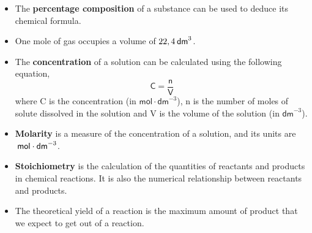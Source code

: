 \begin{itemize}[noitemsep]
\label{m38712*uid116}\item The \textbf{percentage composition} of a substance can be used to deduce its chemical formula.
\label{m38712*uid117}\item One mole of gas occupies a volume of $22,4\phantom{\rule{2pt}{0ex}}{\mathsf{dm}}^{3}$.
\label{m38712*uid118}\item The \textbf{concentration} of a solution can be calculated using the following equation,
\label{m38712*id286019}\nopagebreak\noindent{}
    \begin{equation*}
    \mathsf{C}=\frac{\mathsf{n}}{\mathsf{V}}
      \end{equation*}
where C is the concentration (in $\mathsf{mol}\ensuremath{\cdot}{\mathsf{dm}}^{-3}$), n is the number of moles of solute dissolved in the solution and V is the volume of the solution (in ${\mathsf{dm}}^{-3}$).
\label{m38712*uid119}\item \textbf{Molarity} is a measure of the concentration of a solution, and its units are $\phantom{\rule{2pt}{0ex}}\mathsf{mol}\ensuremath{\cdot}{\mathsf{dm}}^{-3}$.
\label{m38712*uid120}\item \textbf{Stoichiometry} is the calculation of the quantities of reactants and products in chemical reactions. It is also the numerical relationship between reactants and products.
\item The theoretical yield of a reaction is the maximum amount of product that we expect to get out of a reaction.\end{itemize}
\label{m38712*secfhsst!!!underscore!!!id2334}
